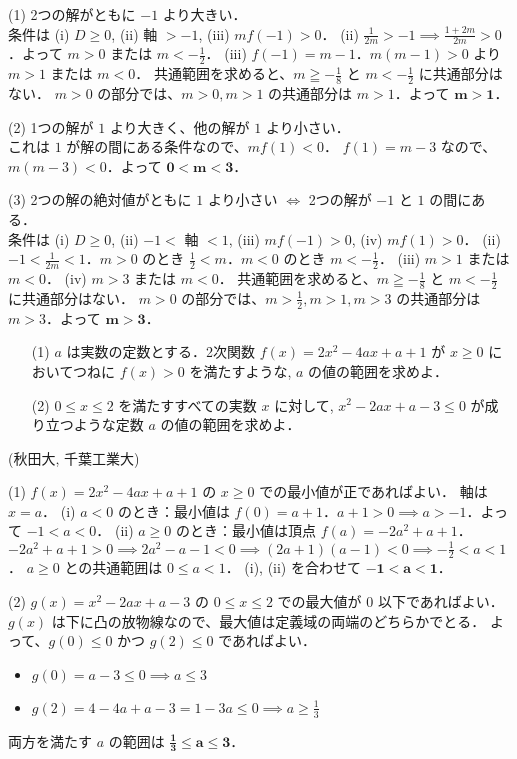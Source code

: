 \documentclass[a4paper,11pt]{ltjsarticle}
\begin{document}
(1) 2つの解がともに $-1$ より大きい．\\
条件は (i) $D \ge 0$, (ii) 軸 $>-1$, (iii) $m f(-1)>0$．
(ii) $\frac{1}{2m}>-1 \implies \frac{1+2m}{2m}>0$．よって $m>0$ または $m<-\frac{1}{2}$．
(iii) $f(-1)=m-1$．$m(m-1)>0$ より $m>1$ または $m<0$．
共通範囲を求めると、$m \geqq -\frac{1}{8}$ と $m<-\frac{1}{2}$ に共通部分はない．
$m>0$ の部分では、$m>0, m>1$ の共通部分は $m>1$．よって $\boldsymbol{m>1}$．

(2) 1つの解が $1$ より大きく、他の解が $1$ より小さい．\\
これは $1$ が解の間にある条件なので、$m f(1)<0$．
$f(1)=m-3$ なので、$m(m-3)<0$．よって $\boldsymbol{0 < m < 3}$．

(3) 2つの解の絶対値がともに $1$ より小さい $\iff$ 2つの解が $-1$ と $1$ の間にある．\\
条件は (i) $D \ge 0$, (ii) $-1<$ 軸 $<1$, (iii) $m f(-1)>0$, (iv) $m f(1)>0$．
(ii) $-1 < \frac{1}{2m} < 1$．$m>0$ のとき $\frac{1}{2} < m$．$m<0$ のとき $m < -\frac{1}{2}$．
(iii) $m>1$ または $m<0$．
(iv) $m>3$ または $m<0$．
共通範囲を求めると、$m \geqq -\frac{1}{8}$ と $m<-\frac{1}{2}$ に共通部分はない．
$m>0$ の部分では、$m>\frac{1}{2}, m>1, m>3$ の共通部分は $m>3$．よって $\boldsymbol{m>3}$．
\newpage
\begin{toi}
\begin{enumerate}
    \item[(1)] $a$ は実数の定数とする．2次関数 $f(x) = 2x^2 - 4ax + a + 1$ が $x \ge 0$ においてつねに $f(x) > 0$ を満たすような, $a$ の値の範囲を求めよ．
    \item[(2)] $0 \le x \le 2$ を満たすすべての実数 $x$ に対して, $x^2 - 2ax + a - 3 \le 0$ が成り立つような定数 $a$ の値の範囲を求めよ．
\end{enumerate}
\hfill (秋田大, 千葉工業大)
\end{toi}
\ans 
(1) $f(x)=2x^2-4ax+a+1$ の $x \ge 0$ での最小値が正であればよい．
軸は $x=a$．
(i) $a < 0$ のとき：最小値は $f(0)=a+1$．$a+1>0 \implies a>-1$．よって $-1<a<0$．
(ii) $a \ge 0$ のとき：最小値は頂点 $f(a)=-2a^2+a+1$．
$-2a^2+a+1>0 \implies 2a^2-a-1<0 \implies (2a+1)(a-1)<0 \implies -\frac{1}{2}<a<1$．
$a \ge 0$ との共通範囲は $0 \le a < 1$．
(i), (ii) を合わせて $\boldsymbol{-1 < a < 1}$．

(2) $g(x)=x^2-2ax+a-3$ の $0 \le x \le 2$ での最大値が $0$ 以下であればよい．
$g(x)$ は下に凸の放物線なので、最大値は定義域の両端のどちらかでとる．
よって、$g(0) \le 0$ かつ $g(2) \le 0$ であればよい．
\begin{itemize}
    \item $g(0) = a-3 \le 0 \implies a \le 3$
    \item $g(2) = 4-4a+a-3 = 1-3a \le 0 \implies a \ge \frac{1}{3}$
\end{itemize}
両方を満たす $a$ の範囲は $\boldsymbol{\frac{1}{3} \le a \le 3}$．
\end{document}
